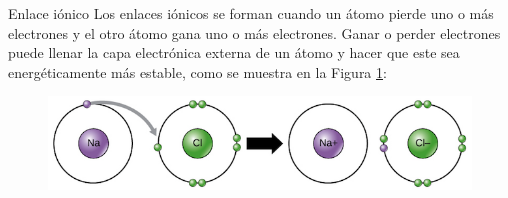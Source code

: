 \begin{infocard}{Enlace iónico}
    Los enlaces iónicos se forman cuando un átomo pierde uno o más electrones y el otro átomo gana uno o más electrones.
    Ganar o perder electrones puede llenar la capa electrónica externa de un átomo y hacer que este sea energéticamente más estable, como se muestra en la Figura \ref{fig:enlace_ionico}:

    \begin{figure}[H]
        \includegraphics[width=0.9\linewidth]{../images/a05bd453d0dc5add39892ed10f63bc92a5508539}
        \caption{}
        \label{fig:enlace_ionico}
    \end{figure}
\end{infocard}